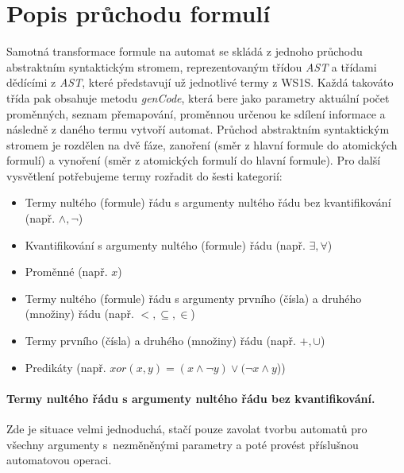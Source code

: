\section{Popis průchodu formulí}

Samotná transformace formule na automat se skládá z jednoho průchodu abstraktním syntaktickým stromem, reprezentovaným třídou \textit{AST} a třídami dědícími z \textit{AST}, které představují už jednotlivé termy z WS1S. Každá takováto třída pak obsahuje metodu \textit{genCode}, která bere jako parametry aktuální počet proměnných, seznam přemapování, proměnnou určenou ke sdílení informace a následně z daného termu vytvoří automat. Průchod abstraktním syntaktickým stromem je rozdělen na dvě fáze, zanoření (směr z hlavní formule do atomických formulí) a vynoření (směr z atomických formulí do hlavní formule). Pro další vysvětlení potřebujeme termy rozřadit do šesti kategorií:

\begin{itemize}
    \item Termy nultého (formule) řádu s argumenty nultého řádu bez kvantifikování (např. $\wedge,\neg$)
    \item Kvantifikování s argumenty nultého (formule) řádu (např. $\exists,\forall$)
    \item Proměnné (např. $x$)
    \item Termy nultého (formule) řádu s argumenty prvního (čísla) a druhého (množiny) řádu (např. $<,\subseteq,\in$)
    \item Termy prvního (čísla) a druhého (množiny) řádu (např. $+,\cup$)
    \item Predikáty (např. $xor(x,y) = (x \wedge \neg y) \vee (\neg x \wedge y$))
\end{itemize}

\paragraph{Termy nultého řádu s argumenty nultého řádu bez kvantifikování.} Zde je situace velmi jednoduchá, stačí pouze zavolat tvorbu automatů pro všechny argumenty s~nezměněnými parametry a poté provést příslušnou automatovou operaci.


